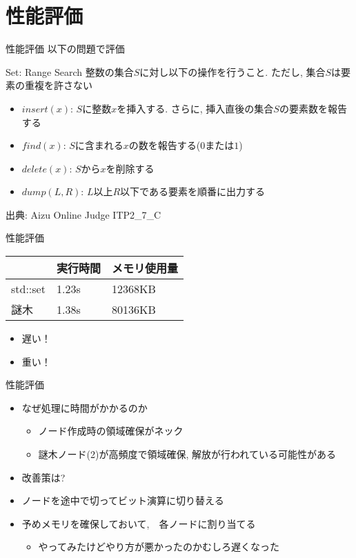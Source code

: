 \documentclass[dvipdfmx,12pt,notheorems]{beamer}
\theoremstyle{definition}
\begin{document}
\section{性能評価}
\begin{frame}{性能評価}
以下の問題で評価
\begin{exampleblock}{Set: Range Search}
整数の集合$S$に対し以下の操作を行うこと. ただし, 集合$S$は要素の重複を許さない
\begin{itemize}
\item $insert(x)$: $S$に整数$x$を挿入する. さらに, 挿入直後の集合$S$の要素数を報告する
\item $find(x)$: $S$に含まれる$x$の数を報告する($0$または$1$)
\item $delete(x)$: $S$から$x$を削除する
\item $dump(L,R)$: $L$以上$R$以下である要素を順番に出力する
\end{itemize}
\small{出典: Aizu Online Judge ITP2\_7\_C}
\end{exampleblock}
\end{frame}

\begin{frame}{性能評価}
\begin{block}{}
\begin{center}
\begin{tabular}{|l|ll|}\hline
 & 実行時間 & メモリ使用量 \\\hline
std::set & 1.23s & 12368KB \\
謎木 & \alert<2->{1.38s} & \alert<3->{80136KB}\\\hline
\end{tabular}
\end{center}
\end{block}
\begin{itemize}
\pause
\item \LARGE{\alert{遅い！}}
\pause
\item \LARGE{\alert{重い！}}
\end{itemize}
\end{frame}

\begin{frame}{性能評価}
\begin{itemize}
\item なぜ処理に時間がかかるのか
\pause
\begin{itemize}
\item ノード作成時の領域確保がネック
\item 謎木ノード(2)が高頻度で領域確保, 解放が行われている可能性がある
\end{itemize}
\item 改善策は?
\pause
\item ノードを途中で切ってビット演算に切り替える
\pause
\item 予めメモリを確保しておいて,　各ノードに割り当てる
\begin{itemize} \item やってみたけどやり方が悪かったのかむしろ遅くなった \end{itemize}
\end{itemize}
\end{frame}
\end{document}
